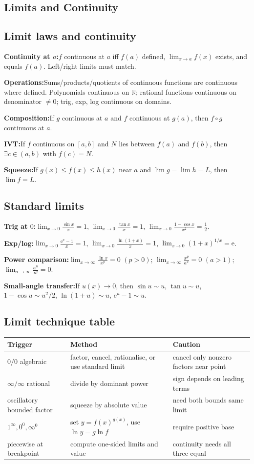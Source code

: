 \documentclass[10pt]{article}
\newcommand{\R}{\mathbb{R}}
\newcommand{\e}{\mathrm e}
\newenvironment{cheatitems}{\par\vspace{-2pt}}{\par\vspace{-2pt}}
\newcommand{\cheatrow}[2]{%
  \par\noindent\textbf{#1:}\nobreak\hspace{0.25em}#2\par
}
\begin{document}
\begin{multicols}{3}
\section*{Limits and Continuity}

\subsection*{Limit laws and continuity}
\begin{cheatitems}
\cheatrow{Continuity at $a$}{$f$ continuous at $a$ iff $f(a)$ defined, $\lim_{x\to a}f(x)$ exists, and equals $f(a)$. Left/right limits must match.}
\cheatrow{Operations}{Sums/products/quotients of continuous functions are continuous where defined. Polynomials continuous on $\R$; rational functions continuous on denominator $\ne0$; trig, exp, log continuous on domains.}
\cheatrow{Composition}{If $g$ continuous at $a$ and $f$ continuous at $g(a)$, then $f\circ g$ continuous at $a$.}
\cheatrow{IVT}{If $f$ continuous on $[a,b]$ and $N$ lies between $f(a)$ and $f(b)$, then $\exists c\in(a,b)$ with $f(c)=N$.}
\cheatrow{Squeeze}{If $g(x)\le f(x)\le h(x)$ near $a$ and $\lim g=\lim h=L$, then $\lim f=L$.}
\end{cheatitems}

\subsection*{Standard limits}
\begin{cheatitems}
\cheatrow{Trig at $0$}{$\displaystyle\lim_{x\to0}\frac{\sin x}{x}=1$, $\lim_{x\to0}\frac{\tan x}{x}=1$, $\lim_{x\to0}\frac{1-\cos x}{x^2}=\frac12$.}
\cheatrow{Exp/log}{$\displaystyle\lim_{x\to0}\frac{\e^x-1}{x}=1$, $\lim_{x\to0}\frac{\ln(1+x)}{x}=1$, $\lim_{x\to0}(1+x)^{1/x}=\e$.}
\cheatrow{Power comparison}{$\displaystyle\lim_{x\to\infty}\frac{\ln x}{x^p}=0$ $(p>0)$; $\lim_{x\to\infty}\frac{x^p}{a^x}=0$ $(a>1)$; $\lim_{n\to\infty}\frac{a^n}{n!}=0$.}
\cheatrow{Small-angle transfer}{If $u(x)\to0$, then $\sin u\sim u$, $\tan u\sim u$, $1-\cos u\sim u^2/2$, $\ln(1+u)\sim u$, $\e^u-1\sim u$.}
\end{cheatitems}

\subsection*{Limit technique table}
\begin{tabular}{@{}L{0.24\columnwidth}L{0.39\columnwidth}L{0.29\columnwidth}@{}}
\toprule
\textbf{Trigger} & \textbf{Method} & \textbf{Caution}\tabularnewline
\midrule
$0/0$ algebraic & factor, cancel, rationalise, or use standard limit & cancel only nonzero factors near point\tabularnewline
$\infty/\infty$ rational & divide by dominant power & sign depends on leading terms\tabularnewline
oscillatory bounded factor & squeeze by absolute value & need both bounds same limit\tabularnewline
$1^\infty,0^0,\infty^0$ & set $y=f(x)^{g(x)}$, use $\ln y=g\ln f$ & require positive base\tabularnewline
piecewise at breakpoint & compute one-sided limits and value & continuity needs all three equal\tabularnewline
\bottomrule
\end{tabular}


\end{multicols}
\end{document}
